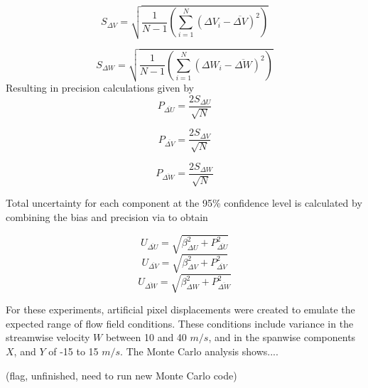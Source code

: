\begin{equation}
S_{\Delta V} = \sqrt{\frac{1}{N-1} \left(\sum_{i=1}^N (\Delta V_i - 
	\overline{\Delta V})^2 \right)}
\label{eq:Vsd}
\end{equation}

\begin{equation}
S_{\Delta W} = \sqrt{\frac{1}{N-1} \left(\sum_{i=1}^N (\Delta W_i - 
	\overline{\Delta W})^2 \right)}
\label{eq:Wsd}
\end{equation}
%
Resulting in precision calculations given by 
%	
\begin{equation}
P_{\overline{\Delta U}} = \frac{2 S_{\Delta U}}{\sqrt{N}}
\label{eq:Uprec}
\end{equation}

\begin{equation}
P_{\overline{\Delta V}} = \frac{2 S_{\Delta V}}{\sqrt{N}}
\label{eq:Vsd}
\end{equation}

\begin{equation}
P_{\overline{\Delta W}} = \frac{2 S_{\Delta W}}{\sqrt{N}}
\label{eq:Wsd}
\end{equation}

Total uncertainty for each component at the 95\% confidence level is calculated 
by combining the bias and precision via to obtain

\begin{equation}
U_{\overline{\Delta U}} = \sqrt{\beta_{\Delta U}^2 + P_{\overline{\Delta U}}^2}
\label{eq:Uuncert}
\end{equation}
\begin{equation}
U_{\overline{\Delta V}} = \sqrt{\beta_{\Delta V}^2 + P_{\overline{\Delta V}}^2}
\label{eq:Vuncert}
\end{equation}
\begin{equation}
U_{\overline{\Delta W}} = \sqrt{\beta_{\Delta W}^2 + P_{\overline{\Delta W}}^2}
\label{eq:Wuncert}
\end{equation}


For these experiments, artificial pixel displacements were created to emulate 
the expected range of flow field conditions. These conditions include variance 
in the streamwise velocity $W$ between 10 and 40 $m/s$, and in the spanwise 
components $X$, and $Y$ of -15 to 15 $m/s$. The Monte Carlo analysis shows....

(flag, unfinished, need to run new Monte Carlo code)